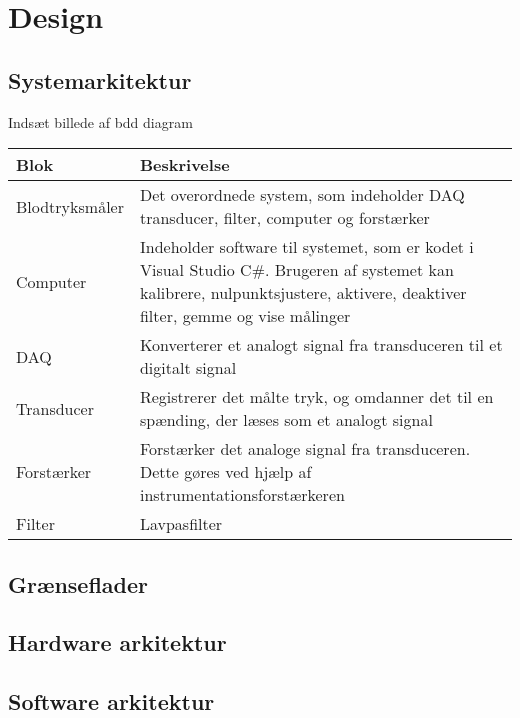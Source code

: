 \chapter{Design}

\section{Systemarkitektur} 
Indsæt billede af bdd diagram

\begin{longtabu} to 
	Blok &	Beskrivelse \\[-1ex]
	\midrule
	Blodtryksmåler & Det overordnede system, som indeholder DAQ transducer, filter, computer og forstærker\\[-1ex]
	Computer & Indeholder software til systemet, som er kodet i Visual Studio C\#. Brugeren af systemet kan kalibrere, nulpunktsjustere, aktivere, deaktiver filter, gemme og vise målinger\\[-1ex]
	DAQ & Konverterer et analogt signal fra transduceren til et digitalt signal\\[-1ex]
	Transducer & Registrerer det målte tryk, og omdanner det til en spænding, der læses som et analogt signal\\[-1ex]
	Forstærker & Forstærker det analoge signal fra transduceren. Dette gøres ved hjælp af instrumentationsforstærkeren\\[-1ex]
	Filter & Lavpasfilter\\[-1ex]
\end{longtabu}


\section{Grænseflader}


\section{Hardware arkitektur}


\section{Software arkitektur}

